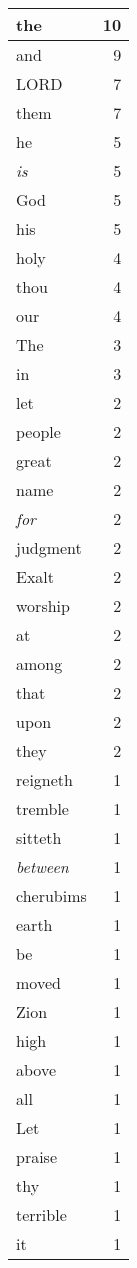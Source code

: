 \begin{center}
\begin{longtable}{l|r}
\hline \hline
\endlastfoot
the & 10 \\ \hline
and & 9 \\ \hline
LORD & 7 \\ \hline
them & 7 \\ \hline
he & 5 \\ \hline
\emph{is} & 5 \\ \hline
God & 5 \\ \hline
his & 5 \\ \hline
holy & 4 \\ \hline
thou & 4 \\ \hline
our & 4 \\ \hline
The & 3 \\ \hline
in & 3 \\ \hline
let & 2 \\ \hline
people & 2 \\ \hline
great & 2 \\ \hline
name & 2 \\ \hline
\emph{for} & 2 \\ \hline
judgment & 2 \\ \hline
Exalt & 2 \\ \hline
worship & 2 \\ \hline
at & 2 \\ \hline
among & 2 \\ \hline
that & 2 \\ \hline
upon & 2 \\ \hline
they & 2 \\ \hline
reigneth & 1 \\ \hline
tremble & 1 \\ \hline
sitteth & 1 \\ \hline
\emph{between} & 1 \\ \hline
cherubims & 1 \\ \hline
earth & 1 \\ \hline
be & 1 \\ \hline
moved & 1 \\ \hline
Zion & 1 \\ \hline
high & 1 \\ \hline
above & 1 \\ \hline
all & 1 \\ \hline
Let & 1 \\ \hline
praise & 1 \\ \hline
thy & 1 \\ \hline
terrible & 1 \\ \hline
it & 1 \\ \hline

\end{longtable}
\end{center}

